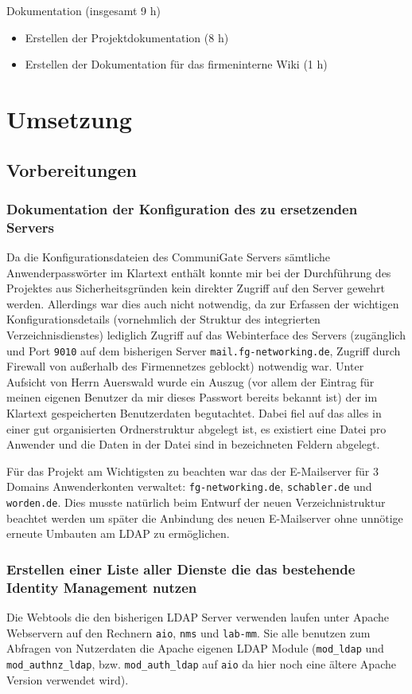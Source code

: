 \documentclass[11pt,a4paper,titlepage=firstiscover]{scrartcl} %
\begin{document}
Dokumentation (insgesamt 9 h)
	\begin{itemize}
	\item Erstellen der Projektdokumentation (8 h)
	\item Erstellen der Dokumentation für das firmeninterne Wiki (1 h)
	\end{itemize}

\section{Umsetzung}
\subsection{Vorbereitungen}
\subsubsection{Dokumentation der Konfiguration des zu ersetzenden Servers}\label{sec:Konfig-Doku-Alt}
Da die Konfigurationsdateien des CommuniGate Servers sämtliche Anwenderpasswörter im Klartext enthält konnte mir bei der Durchführung des Projektes aus Sicherheitsgründen kein direkter Zugriff auf den Server gewehrt werden. Allerdings war dies auch nicht notwendig, da zur Erfassen der wichtigen Konfigurationsdetails (vornehmlich der Struktur des integrierten Verzeichnisdienstes) lediglich Zugriff auf das Webinterface des Servers (zugänglich und Port \texttt{9010} auf dem bisherigen Server \texttt{mail.fg-networking.de}, Zugriff durch Firewall von außerhalb des Firmennetzes geblockt) notwendig war. Unter Aufsicht von Herrn Auerswald wurde ein Auszug (vor allem der Eintrag für meinen eigenen Benutzer da mir dieses Passwort bereits bekannt ist) der im Klartext gespeicherten Benutzerdaten begutachtet. Dabei fiel auf das alles in einer gut organisierten Ordnerstruktur abgelegt ist, es existiert eine Datei pro Anwender und die Daten in der Datei sind in bezeichneten Feldern abgelegt.

Für das Projekt am Wichtigsten zu beachten war das der E-Mailserver für 3 Domains Anwenderkonten verwaltet: \texttt{fg-networking.de}, \texttt{schabler.de} und \texttt{worden.de}. Dies musste natürlich beim Entwurf der neuen Verzeichnistruktur beachtet werden um später die Anbindung des neuen E-Mailserver ohne unnötige erneute Umbauten am LDAP zu ermöglichen.

\subsubsection{Erstellen einer Liste aller Dienste die das bestehende Identity Management nutzen}
Die Webtools die den bisherigen LDAP Server verwenden laufen unter Apache Webservern auf den Rechnern \texttt{aio}, \texttt{nms} und \texttt{lab-mm}. Sie alle benutzen zum Abfragen von Nutzerdaten die Apache eigenen LDAP Module (\texttt{mod\_ldap} und \texttt{mod\_authnz\_ldap}, bzw. \texttt{mod\_auth\_ldap} auf \texttt{aio} da hier noch eine ältere Apache Version verwendet wird). 
\end{document}
